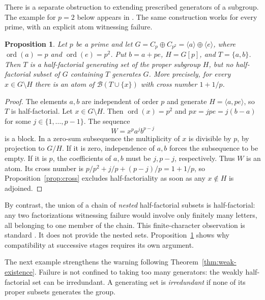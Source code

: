 \documentclass[11pt,reqno]{amsart}
\numberwithin{equation}{section}
\newtheorem{proposition}[theorem]{Proposition}
\theoremstyle{definition}
\theoremstyle{remark}
\newcommand{\B}{\mathcal B}
\DeclareMathOperator{\ord}{ord}
\begin{document}
There is a separate obstruction to extending prescribed generators
of a subgroup. The example for $p=2$ below appears in
\cite[p.~851, Remark~2]{GeroldingerGoebel}. The same construction
works for every prime, with an explicit atom witnessing failure.


\begin{proposition}\label{prop:extension}
Let $p$ be a prime and let
$G=C_p\oplus C_{p^2}=\langle a\rangle\oplus\langle e\rangle$,
where $\ord(a)=p$ and $\ord(e)=p^2$. Put
$b=a+pe$, $H=G[p]$, and $T=\{a,b\}$. Then $T$ is a
half-factorial generating set of the proper subgroup $H$, but no
half-factorial subset of $G$ containing $T$ generates $G$.
More precisely, for every $x\in G\setminus H$ there is an atom
of $\B(T\cup\{x\})$ with cross number $1+1/p$.
\end{proposition}

\begin{proof}
The elements $a,b$ are independent of order $p$ and generate
$H=\langle a,pe\rangle$, so $T$ is half-factorial. Let
$x\in G\setminus H$. Then $\ord(x)=p^2$ and
$px=jpe=j(b-a)$ for some $j\in\{1,\ldots,p-1\}$. The sequence
\begin{equation}\label{eq:finite-obstruction}
 W=x^p a^j b^{p-j}
\end{equation}
is a block. In a zero-sum subsequence the multiplicity of $x$
is divisible by $p$, by projection to $G/H$. If it is zero,
independence of $a,b$ forces the subsequence to be empty. If it
is $p$, the coefficients of $a,b$ must be $j,p-j$, respectively.
Thus $W$ is an atom. Its cross number is
$p/p^2+j/p+(p-j)/p=1+1/p$, so
Proposition~\ref{prop:cross} excludes half-factoriality as soon
as any $x\notin H$ is adjoined.
\end{proof}

By contrast, the union of a chain of \emph{nested} half-factorial
subsets is half-factorial: any two factorizations witnessing failure
would involve only finitely many letters, all belonging to one
member of the chain. This finite-character observation is standard
\cite[Lemma~3.1]{GaoGeroldinger}. It does not provide the nested
sets. Proposition~\ref{prop:extension} shows why compatibility at
successive stages requires its own argument.

The next example strengthens the warning following
Theorem~\ref{thm:weak-existence}. Failure is not confined to taking
too many generators: the weakly half-factorial set can be
irredundant. A generating set is \emph{irredundant} if none of its
proper subsets generates the group.
\end{document}
